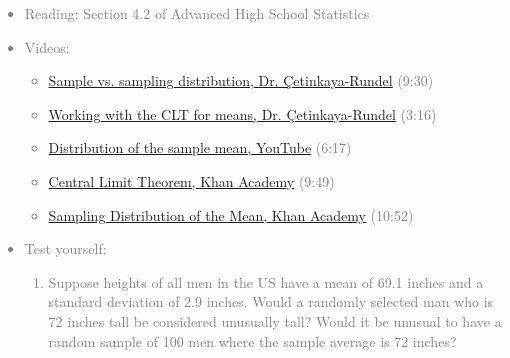\documentclass[11pt]{article}
\newcommand{\gray}[1]{\textcolor{gray}{#1}}
\begin{document}
\gray{
{\it
\vspace{-0.5cm}
\begin{itemize}
\renewcommand{\labelitemi}{{\textcolor{dark}{$\ast$}}}
\item Reading: Section 4.2 of Advanced High School Statistics
\item Videos: 
\begin{itemize}
\item \href{http://www.youtube.com/watch?v=dF18I7-Re4I}{Sample vs. sampling distribution, Dr. \c{C}etinkaya-Rundel} (9:30)
\item \href{http://www.youtube.com/watch?v=Cvc8sYAKmtI}{Working with the CLT for means, Dr. \c{C}etinkaya-Rundel} (3:16)
\item \href{http://www.youtube.com/watch?v=j4ZpJ0T6eFw&feature=autoplay&list=PL568547ACA9211CCA&playnext=1}{Distribution of the sample mean, YouTube} (6:17)
\item \href{http://www.khanacademy.org/math/statistics/v/central-limit-theorem}{Central Limit Theorem, Khan Academy} (9:49)
\item \href{http://www.khanacademy.org/math/statistics/v/sampling-distribution-of-the-sample-mean}{Sampling Distribution of the Mean, Khan Academy} (10:52)
\end{itemize}
\item Test yourself: 
{\small
\begin{enumerate}
\item Suppose heights of all men in the US have a mean of 69.1 inches and a standard deviation of 2.9 inches. Would a randomly selected man who is 72 inches tall be considered unusually tall? Would it be unusual to have a random sample of 100 men where the sample average is 72 inches?
\end{enumerate}
}
\end{itemize}
}}



\vspace{0.48cm}
%
\end{document}
